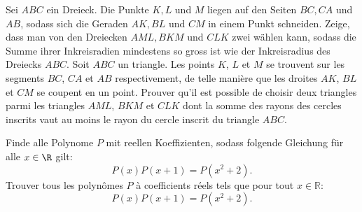 \documentclass[language=german,style=exam]{smo} %
\begin{document}
\begin{enumerate}
{\bigskip
\bigskip

\item[\textbf{5.}] %

\ifgerman %
Sei $ABC$ ein Dreieck. Die Punkte $K, L$ und $M$ liegen auf den Seiten $BC, CA$ und $AB$, sodass sich die Geraden $AK, BL$ und $CM$ in einem Punkt schneiden. Zeige, dass man von den Dreiecken $AML, BKM$ und $CLK$ zwei wählen kann, sodass die Summe ihrer Inkreisradien mindestens so gross ist wie der Inkreisradius des Dreiecks $ABC$.  
\fi
\iffrench %
Soit $ABC$ un triangle. Les points $K$, $L$ et $M$ se trouvent sur les segments $BC$, $CA$ et $AB$ respectivement, de telle manière que les droites $AK$, $BL$ et $CM$ se coupent en un point. Prouver qu’il est possible de choisir deux triangles parmi les triangles $AML$, $BKM$ et $CLK$ dont la somme des rayons des cercles inscrits vaut au moins le rayon du cercle inscrit du triangle $ABC$.
\fi
\ifitalian %

\fi

\bigskip
\bigskip

\item[\textbf{6.}] %
\ifgerman %
Finde alle Polynome $P$ mit reellen Koeffizienten, sodass folgende Gleichung für alle $x \in \R$ gilt:
\[
P(x)P(x+1) = P ( x^2 + 2).
\]
\fi
\iffrench %
Trouver tous les polynômes $P$ à coefficients réels tels que pour tout $x \in \mathbb{R}$:
\[
P(x)P(x+1) = P ( x^2 + 2).
\]
\fi
\ifitalian %
\fi
}

\end{enumerate}
\end{document}

